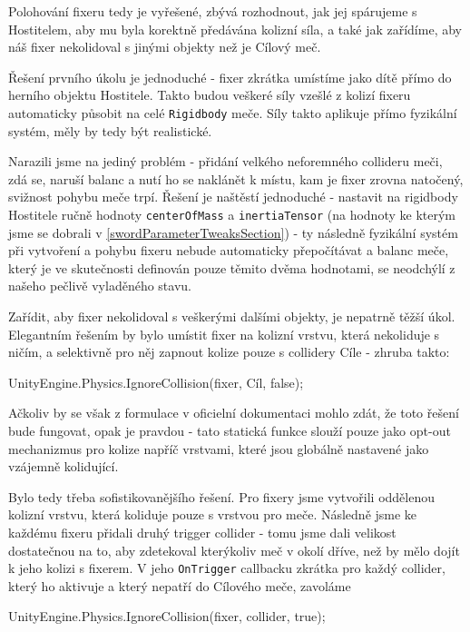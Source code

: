 Polohování fixeru tedy je vyřešené, zbývá rozhodnout, jak jej spárujeme s Hostitelem, aby mu byla korektně předávána kolizní síla, a také jak zařídíme, aby náš fixer nekolidoval s jinými objekty než je Cílový meč.

Řešení prvního úkolu je jednoduché - fixer zkrátka umístíme jako dítě přímo do herního objektu Hostitele. Takto budou veškeré síly vzešlé z kolizí fixeru automaticky působit na celé \texttt{Rigidbody} meče. Síly takto aplikuje přímo fyzikální systém, měly by tedy být realistické. 

Narazili jsme na jediný problém - přidání velkého neforemného collideru meči, zdá se, naruší balanc a nutí ho se naklánět k místu, kam je fixer zrovna natočený, svižnost pohybu meče trpí. Řešení je naštěstí jednoduché - nastavit na rigidbody Hostitele ručně hodnoty \texttt{centerOfMass} a \texttt{inertiaTensor} (na hodnoty ke kterým jsme se dobrali v \ref{swordParameterTweaksSection}) - ty následně fyzikální systém při vytvoření a pohybu fixeru nebude automaticky přepočítávat a balanc meče, který je ve skutečnosti definován pouze těmito dvěma hodnotami, se neodchýlí z našeho pečlivě vyladěného stavu. 

\bigbreak

Zařídit, aby fixer nekolidoval s veškerými dalšími objekty, je nepatrně těžší úkol. Elegantním řešením by bylo umístit fixer na kolizní vrstvu, která nekoliduje s ničím, a selektivně pro něj zapnout kolize pouze s collidery Cíle - zhruba takto:
\begin{code}
 UnityEngine.Physics.IgnoreCollision(fixer, Cíl, false);
\end{code}
Ačkoliv by se však z formulace v oficielní dokumentaci mohlo zdát, že toto řešení bude fungovat, opak je pravdou - tato statická funkce slouží pouze jako opt-out mechanizmus pro kolize napříč vrstvami, které jsou globálně nastavené jako vzájemně kolidující.

Bylo tedy třeba sofistikovanějšího řešení. Pro fixery jsme vytvořili oddělenou kolizní vrstvu, která koliduje pouze s vrstvou pro meče. Následně jsme ke každému fixeru přidali druhý trigger collider - tomu jsme dali velikost dostatečnou na to, aby zdetekoval kterýkoliv meč v okolí dříve, než by mělo dojít k jeho kolizi s fixerem. V jeho \texttt{OnTrigger} callbacku zkrátka pro každý collider, který ho aktivuje a který nepatří do Cílového meče, zavoláme 
\begin{code}
 UnityEngine.Physics.IgnoreCollision(fixer, collider, true);
\end{code}

